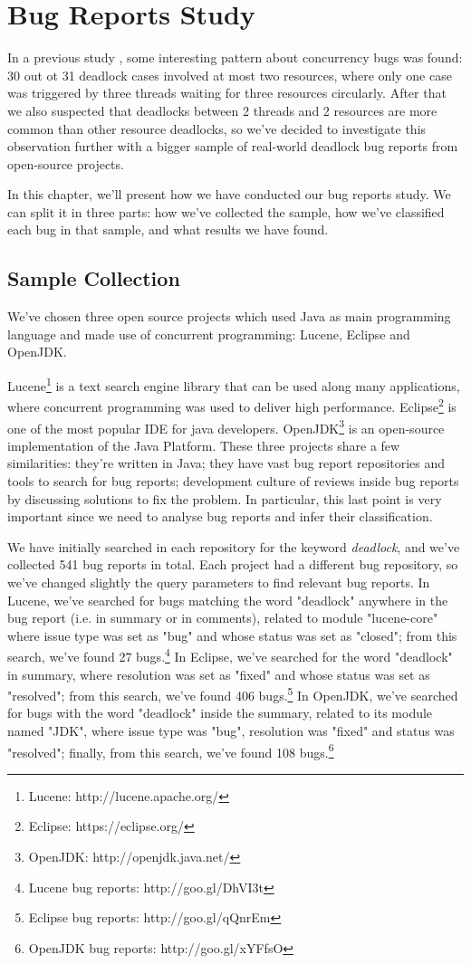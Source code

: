 \section{Bug Reports Study}

In a previous study \cite{lu}, some interesting pattern about concurrency bugs was found: 30 out ot 31 deadlock cases involved at most two resources, where only one case was triggered by three threads waiting for three resources circularly. After that we also suspected that deadlocks between 2 threads and 2 resources are more common than other resource deadlocks, so we've decided to investigate this observation further with a bigger sample of real-world deadlock bug reports from open-source projects.

In this chapter, we'll present how we have conducted our bug reports study. We can split it in three parts: how we've collected the sample, how we've classified each bug in that sample, and what results we have found.

\subsection{Sample Collection}

We've chosen three open source projects which used Java as main programming language and made use of concurrent programming: Lucene, Eclipse and OpenJDK.

Lucene\footnote{Lucene: http://lucene.apache.org/} is a text search engine library that can be used along many applications, where concurrent programming was used to deliver high performance. Eclipse\footnote{Eclipse: https://eclipse.org/} is one of the most popular IDE for java developers. OpenJDK\footnote{OpenJDK: http://openjdk.java.net/} is an open-source implementation of the Java Platform. These three projects share a few similarities: they're written in Java; they have vast bug report repositories and tools to search for bug reports; development culture of reviews inside bug reports by discussing solutions to fix the problem. In particular, this last point is very important since we need to analyse bug reports and infer their classification.

We have initially searched in each repository for the keyword \emph{deadlock}, and we've collected 541 bug reports in total. Each project had a different bug repository, so we've changed slightly the query parameters to find relevant bug reports. In Lucene, we've searched for bugs matching the word "deadlock" anywhere in the bug report (i.e. in summary or in comments), related to module "lucene-core" where issue type was set as "bug" and whose status was set as "closed"; from this search, we've found 27 bugs.\footnote{Lucene bug reports: http://goo.gl/DhVI3t}
In Eclipse, we've searched for the word "deadlock" in summary, where resolution was set as "fixed" and whose status was set as "resolved"; from this search, we've found 406 bugs.\footnote{Eclipse bug reports: http://goo.gl/qQnrEm}
In OpenJDK, we've searched for bugs with the word "deadlock" inside the summary, related to its module named "JDK", where issue type was "bug", resolution was "fixed" and status was "resolved"; finally, from this search, we've found 108 bugs.\footnote{OpenJDK bug reports: http://goo.gl/xYFfsO}

